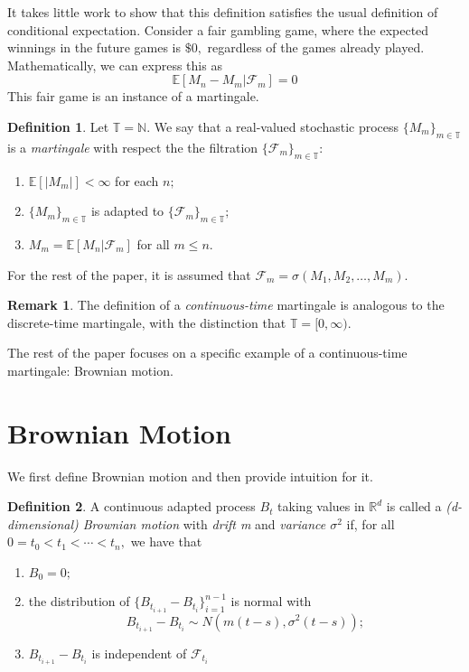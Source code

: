 \documentclass[openany, amssymb, psamsfonts]{amsart}
\theoremstyle{definition}
\newtheorem{defn}{Definition}[section]
\newtheorem{rem}{Remark}[section]
\numberwithin{equation}{section}
\newcommand{\bbE}{\mathbb{E}}
\newcommand{\bbN}{\mathbb{N}}
\newcommand{\bbR}{\mathbb{R}}
\newcommand{\bbT}{\mathbb{T}}
\begin{document}
It takes little work to show that this definition satisfies the usual definition of conditional expectation.\newline\newline
Consider a fair gambling game, where the expected winnings in the future games is $\$0,$ regardless of the games already played. Mathematically, we can express this as
\[\bbE[M_n - M_m | \mathcal{F}_m] = 0\]
This fair game is an instance of a martingale.

\begin{defn} %
Let $\bbT = \bbN.$ We say that a real-valued stochastic process $\{M_m\}_{m\in \bbT}$ is a \textit{martingale} with respect the the filtration $\{\mathcal{F}_m\}_{m\in \bbT}$:
\begin{enumerate}
    \item $\bbE[|M_m|]< \infty$ for each $n;$
    \item $\{M_m\}_{m\in \bbT}$ is adapted to $\{\mathcal{F}_m\}_{m\in \bbT};$
    \item $M_m  = \bbE[M_n | \mathcal{F}_m]$ for all $m\leq n.$
\end{enumerate}
\end{defn}

For the rest of the paper, it is assumed that $\mathcal{F}_m = \sigma(M_1, M_2, \dots, M_m).$
\begin{rem}
The definition of a \textit{continuous-time} martingale is analogous to the discrete-time martingale, with the distinction that $\bbT = [0,\infty).$
\end{rem}
The rest of the paper focuses on a specific example of a continuous-time martingale: Brownian motion.

\section{Brownian Motion}%
We first define Brownian motion and then provide intuition for it.
\begin{defn}
A continuous adapted process $B_t$ taking values in $\bbR^d$ is called a \textit{(d-dimensional) Brownian motion} with \textit{drift m} and \textit{variance $\sigma^2$} if, for all $0 = t_0 < t_1< \cdots < t_n,$ we have that
\begin{enumerate}
\item $B_0 = 0;$
\item the distribution of $\{B_{t_{i+1}} - B_{t_i}\}_{i=1}^{n-1}$ is normal with 
\[B_{t_{i+1}} - B_{t_i} \sim N(m(t-s), \sigma^2(t-s));\]
\item $B_{t_{i+1}} - B_{t_i}$ is independent of $\mathcal{F}_{t_i}$
\end{enumerate}
\end{defn}
\end{document}
